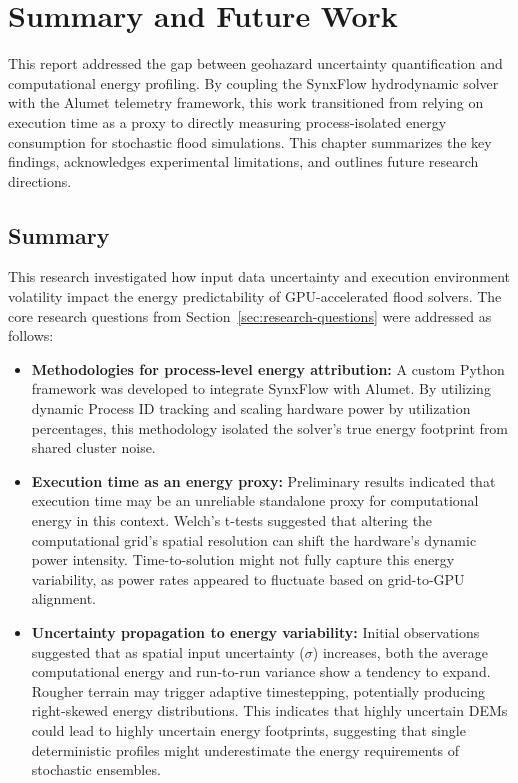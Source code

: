\chapter{Summary and Future Work}\label{ch:summary}

This report addressed the gap between geohazard uncertainty quantification and computational energy profiling. By coupling the SynxFlow hydrodynamic solver with the Alumet telemetry framework, this work transitioned from relying on execution time as a proxy to directly measuring process-isolated energy consumption for stochastic flood simulations. This chapter summarizes the key findings, acknowledges experimental limitations, and outlines future research directions.

\section{Summary}\label{sec:summary}

This research investigated how input data uncertainty and execution environment volatility impact the energy predictability of GPU-accelerated flood solvers. The core research questions from Section~\ref{sec:research-questions} were addressed as follows:
  
\begin{itemize}
    \item[\textit{RQ1}] \textbf{Methodologies for process-level energy attribution:} A custom Python framework was developed to integrate SynxFlow with Alumet. By utilizing dynamic Process ID tracking and scaling hardware power by utilization percentages, this methodology isolated the solver's true energy footprint from shared cluster noise.
    
    \item[\textit{RQ2}] \textbf{Execution time as an energy proxy:} Preliminary results indicated that execution time may be an unreliable standalone proxy for computational energy in this context. Welch's t-tests suggested that altering the computational grid's spatial resolution can shift the hardware's dynamic power intensity. Time-to-solution might not fully capture this energy variability, as power rates appeared to fluctuate based on grid-to-GPU alignment.

    \item[\textit{RQ3}] \textbf{Uncertainty propagation to energy variability:} Initial observations suggested that as spatial input uncertainty ($\sigma$) increases, both the average computational energy and run-to-run variance show a tendency to expand. Rougher terrain may trigger adaptive timestepping, potentially producing right-skewed energy distributions. This indicates that highly uncertain DEMs could lead to highly uncertain energy footprints, suggesting that single deterministic profiles might underestimate the energy requirements of stochastic ensembles.
\end{itemize}

